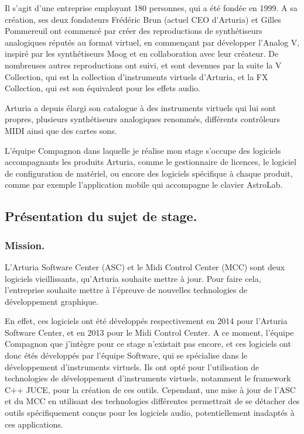 \documentclass[francais]{rapportPFE}  %
\begin{document}
Il s'agit d'une entreprise employant 180 personnes, qui a été fondée en 1999. A sa création, ses deux fondateurs Frédéric Brun (actuel CEO d'Arturia) et Gilles Pommereuil ont commencé par créer des reproductions de synthétiseurs analogiques réputés au format virtuel, en commençant par développer l'Analog V, inspiré par les synthétiseurs Moog et en collaboration avec leur créateur. De nombreuses autres reproductions ont suivi, et sont devenues par la suite la V Collection, qui est la collection d'instruments virtuels d'Arturia, et la FX Collection, qui est son équivalent pour les effets audio.

Arturia a depuis élargi son catalogue à des instruments virtuels qui lui sont propres, plusieurs synthétiseurs analogiques renommés, différents contrôleurs MIDI ainsi que des cartes sons. 

L’équipe Compagnon dans laquelle je réalise mon stage s’occupe des logiciels accompagnants les produits Arturia, comme le gestionnaire de licences, le logiciel de configuration de matériel, ou encore des logiciels spécifique à chaque produit, comme par exemple l'application mobile qui accompagne le clavier AstroLab. 

\subsection{Présentation du sujet de stage.}


\subsubsection{Mission.}

L'Arturia Software Center (ASC) et le Midi Control Center (MCC) sont deux logiciels vieillissants, qu'Arturia souhaite mettre à jour. Pour faire cela, l'entreprise souhaite mettre à l'épreuve de nouvelles technologies de développement graphique.

En effet, ces logiciels ont été développés respectivement en 2014 pour l'Arturia Software Center, et en 2013 pour le Midi Control Center. A ce moment, l'équipe Compagnon que j'intègre pour ce stage n'existait pas encore, et ces logiciels ont donc étés développés par l'équipe Software, qui se spécialise dans le développement d'instruments virtuels. Ils ont opté pour l'utilisation de technologies de développement d'instruments virtuels, notamment le framework C++ JUCE, pour la création de ces outils. Cependant, une mise à jour de l'ASC et du MCC en utilisant des technologies différentes permettrait de se détacher des outils spécifiquement conçus pour les logiciels audio, potentiellement inadaptés à ces applications.
\end{document}
